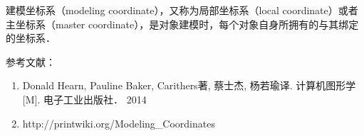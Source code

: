 
建模坐标系（modeling coordinate），又称为局部坐标系（local coordinate）或者主坐标系（master coordinate），是对象建模时，每个对象自身所拥有的与其绑定的坐标系．





参考文献：
\begin{enumerate}
\item Donald Hearn, Pauline Baker, Carithers著, 蔡士杰, 杨若瑜译. 计算机图形学[M]. 电子工业出版社． 2014
\item http://printwiki.org/Modeling_Coordinates
\end{enumerate}